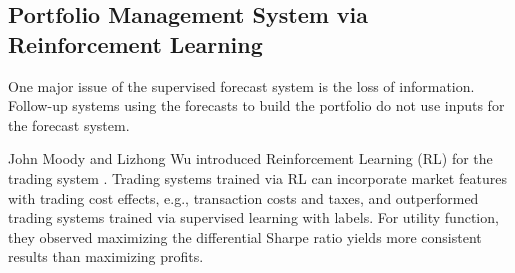\subsection{Portfolio Management System via Reinforcement Learning}
One major issue of the supervised forecast system is the loss of information. Follow-up systems using the forecasts to build the portfolio do not use inputs for the forecast system.
\par
John Moody and Lizhong Wu introduced Reinforcement Learning (RL) for the trading system \cite{618952}. Trading systems trained via RL can incorporate market features with trading cost effects, e.g., transaction costs and taxes, and outperformed trading systems trained via supervised learning with labels. For utility function, they observed maximizing the differential Sharpe ratio yields more consistent results than maximizing profits\cite{618952}.